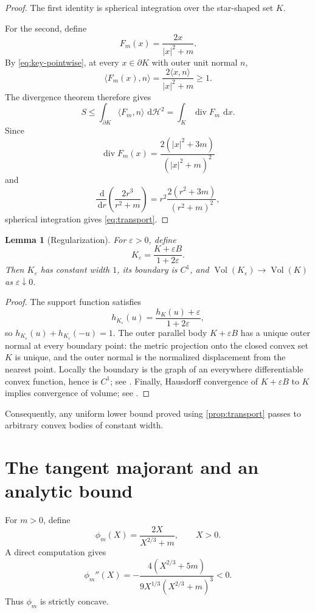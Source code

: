 \documentclass[11pt,reqno]{amsart}
\numberwithin{equation}{section}
\newtheorem{lemma}[theorem]{Lemma}
\theoremstyle{definition}
\theoremstyle{remark}
\newcommand{\Vol}{\operatorname{Vol}}
\newcommand{\dd}{\,\mathrm{d}}
\newcommand{\eps}{\varepsilon}
\newcommand{\ip}[2]{\langle #1,#2\rangle}
\begin{document}
\begin{proof}
The first identity is spherical integration over the star-shaped set $K$.

For the second, define
\[
 F_m(x)=\frac{2x}{|x|^{2}+m}.
\]
By \eqref{eq:key-pointwise}, at every $x\in\partial K$ with outer unit normal $n$,
\[
 \ip{F_m(x)}{n}
 =\frac{2\ip{x}{n}}{|x|^{2}+m}\geq1.
\]
The divergence theorem therefore gives
\[
 S\leq\int_{\partial K}\ip{F_m}{n}\,\dd\mathcal H^{2}
 =\int_K\operatorname{div}F_m\,\dd x.
\]
Since
\[
 \operatorname{div}F_m(x)
 =\frac{2(|x|^{2}+3m)}{(|x|^{2}+m)^{2}}
\]
and
\[
 \frac{\dd}{\dd r}\left(\frac{2r^{3}}{r^{2}+m}\right)
 =r^{2}\frac{2(r^{2}+3m)}{(r^{2}+m)^{2}},
\]
spherical integration gives \eqref{eq:transport}.
\end{proof}

\begin{lemma}[Regularization]\label{lem:regularization}
For $\eps>0$, define
\[
 K_{\eps}=\frac{K+\eps B}{1+2\eps}.
\]
Then $K_{\eps}$ has constant width $1$, its boundary is $C^{1}$, and
$\Vol(K_{\eps})\to\Vol(K)$ as $\eps\downarrow0$.
\end{lemma}

\begin{proof}
The support function satisfies
\[
 h_{K_{\eps}}(u)=\frac{h_K(u)+\eps}{1+2\eps},
\]
so $h_{K_{\eps}}(u)+h_{K_{\eps}}(-u)=1$. The outer parallel body $K+\eps B$ has a unique outer normal at every boundary point: the metric projection onto the closed convex set $K$ is unique, and the outer normal is the normalized displacement from the nearest point. Locally the boundary is the graph of an everywhere differentiable convex function, hence is $C^{1}$; see \cite[Theorem~25.5]{Rockafellar1970}. Finally, Hausdorff convergence of $K+\eps B$ to $K$ implies convergence of volume; see \cite{Schneider2014}.
\end{proof}

Consequently, any uniform lower bound proved using \cref{prop:transport} passes to arbitrary convex bodies of constant width.

\section{The tangent majorant and an analytic bound}\label{sec:majorant}

For $m>0$, define
\[
 \phi_m(X)=\frac{2X}{X^{2/3}+m},\qquad X>0.
\]
A direct computation gives
\begin{equation}\label{eq:phi-second}
 \phi_m''(X)
 =-\frac{4(X^{2/3}+5m)}{9X^{1/3}(X^{2/3}+m)^{3}}<0.
\end{equation}
Thus $\phi_m$ is strictly concave.
\end{document}
